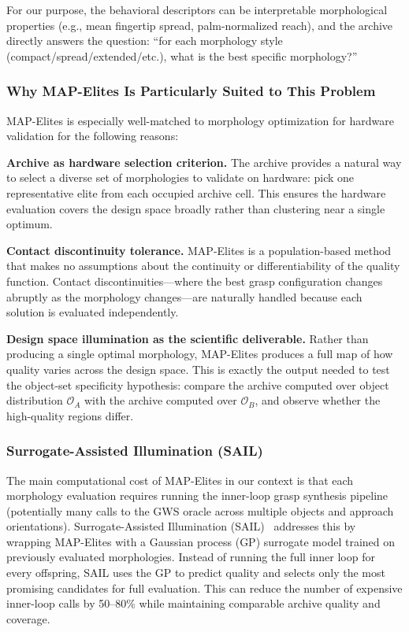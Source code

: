 \documentclass[journal]{IEEEtran}
\newcommand{\cO}{\mathcal{O}}
\begin{document}
For our purpose, the behavioral descriptors can be interpretable morphological properties
(e.g., mean fingertip spread, palm-normalized reach), and the archive directly answers
the question: ``for each morphology style (compact/spread/extended/etc.), what is the
best specific morphology?''

\subsubsection{Why MAP-Elites Is Particularly Suited to This Problem}

MAP-Elites is especially well-matched to morphology optimization for hardware validation
for the following reasons:

\textbf{Archive as hardware selection criterion.}
The archive provides a natural way to select a diverse set of morphologies to validate
on hardware: pick one representative elite from each occupied archive cell.
This ensures the hardware evaluation covers the design space broadly rather than
clustering near a single optimum.

\textbf{Contact discontinuity tolerance.}
MAP-Elites is a population-based method that makes no assumptions about the continuity
or differentiability of the quality function.
Contact discontinuities---where the best grasp configuration changes abruptly as the
morphology changes---are naturally handled because each solution is evaluated independently.

\textbf{Design space illumination as the scientific deliverable.}
Rather than producing a single optimal morphology, MAP-Elites produces a full map of
how quality varies across the design space.
This is exactly the output needed to test the object-set specificity hypothesis:
compare the archive computed over object distribution $\cO_A$ with the archive computed
over $\cO_B$, and observe whether the high-quality regions differ.

\subsubsection{Surrogate-Assisted Illumination (SAIL)}

The main computational cost of MAP-Elites in our context is that each morphology
evaluation requires running the inner-loop grasp synthesis pipeline (potentially many
calls to the GWS oracle across multiple objects and approach orientations).
Surrogate-Assisted Illumination (SAIL)~\cite{gaier2017sail} addresses this by wrapping
MAP-Elites with a Gaussian process (GP) surrogate model trained on previously evaluated
morphologies.
Instead of running the full inner loop for every offspring, SAIL uses the GP to predict
quality and selects only the most promising candidates for full evaluation.
This can reduce the number of expensive inner-loop calls by 50--80\% while maintaining
comparable archive quality and coverage.
\end{document}
